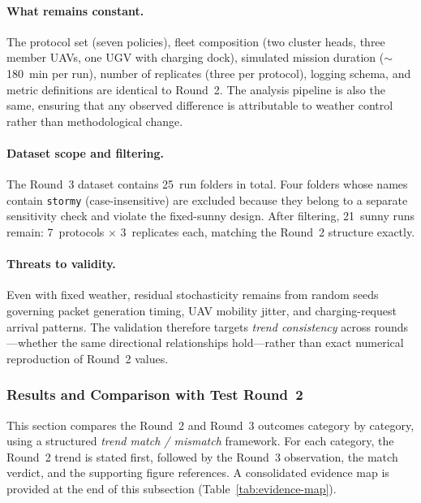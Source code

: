 \paragraph{What remains constant.}
The protocol set (seven policies), fleet composition (two cluster heads,
three member UAVs, one UGV with charging dock), simulated mission
duration ($\sim$180~min per run), number of replicates (three per
protocol), logging schema, and metric definitions are identical to
Round~2.  The analysis pipeline is also the same, ensuring that any
observed difference is attributable to weather control rather than
methodological change.

\paragraph{Dataset scope and filtering.}
The Round~3 dataset contains 25~run folders in total.  Four folders
whose names contain \texttt{stormy} (case-insensitive) are excluded
because they belong to a separate sensitivity check and violate the
fixed-sunny design.  After filtering, 21~sunny runs remain:
7~protocols $\times$ 3~replicates each, matching the Round~2 structure
exactly.

\paragraph{Threats to validity.}
Even with fixed weather, residual stochasticity remains from random
seeds governing packet generation timing, UAV mobility jitter, and
charging-request arrival patterns.  The validation therefore targets
\emph{trend consistency} across rounds---whether the same directional
relationships hold---rather than exact numerical reproduction of
Round~2 values.

\subsubsection{Results and Comparison with Test Round~2}
\label{sec:results:controlled-validation:results}

This section compares the Round~2 and Round~3 outcomes category by
category, using a structured \emph{trend match / mismatch} framework.
For each category, the Round~2 trend is stated first, followed by
the Round~3 observation, the match verdict, and the supporting figure
references.  A consolidated evidence map is provided at the end of
this subsection (Table~\ref{tab:evidence-map}).

